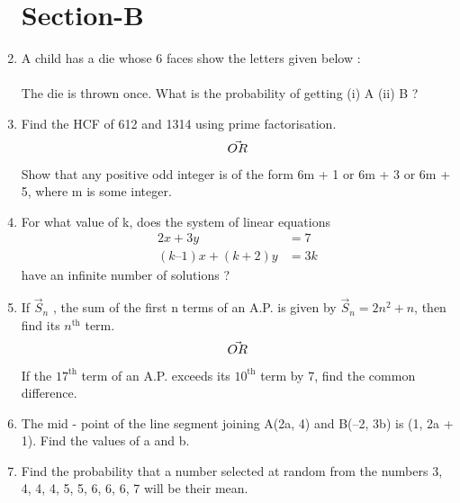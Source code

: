 \documentclass[journal,12pt,twocolumn]{IEEEtran}
\begin{document}
\begin{enumerate}
\section{Section-B}
\item A child has a die whose 6 faces show the letters given below :\\
\;\;\;\;\;\\
The die is thrown once. What is the probability of getting (i) A (ii) B ?
\item Find the HCF of 612 and 1314 using prime factorisation.
\begin{align}
    \centering \vec{OR}\nonumber
\end{align}
Show that any positive odd integer is of the form 6m + 1 or 6m + 3 or 6m + 5, where m is some integer.
\item For what value of k, does the system of linear equations 
\begin{align}
   2x + 3y &= 7 \nonumber \\
   (k – 1) x + (k + 2) y &= 3k \nonumber
   \end{align}
have an infinite number of solutions ?
\item If $\vec{S}_n$ , the sum of the first n terms of an A.P. is given by $\vec{S}_n  = 2n^2 + n$, then
find its $n^{\text{th}}$ term.
\begin{align}
    \centering \vec{OR}\nonumber
\end{align}
If the  $17^{\text{th}}$ term of an A.P. exceeds its  $10^{\text{th}}$ term by 7, find the common difference.
\item The mid - point of the line segment joining A(2a, 4) and B(–2, 3b) is (1, 2a + 1). Find the values of a and b.
\item Find the probability that a number selected at random from the numbers 3, 4, 4, 4, 5, 5, 6, 6, 6, 7 will be their mean.

\end{enumerate}
\end{document}
